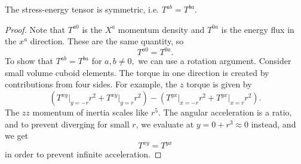 \documentclass{article}
\numberwithin{equation}{section}
\begin{document}
\begin{lemma}
    The stress-energy tensor is symmetric, i.e. $T^{ab} = T^{ba}.$
\end{lemma}
\begin{proof}
    Note that $T^{a0}$ is the $X^a$ momentum density and $T^{0a}$ is the energy flux in the $x^a$ direction. These are the same quantity, so 
    \begin{equation*}
        T^{a0} = T^{0a}.
    \end{equation*}
    To show that $T^{ab}=T^{ba}$ for $a,b \neq 0,$ we can use a rotation argument. Consider small volume cuboid elements. The torque in one direction is created by contributions from four sides. For example, the $z$ torque is given by 
    \begin{equation*}
        \left(T^{xy}\bigg|_{y=-r}r^2 + T^{xy}\bigg|_{y=r}r^2\right)  - \left(T^{yx}\bigg|_{x=-r}r^2 + T^{yx}\bigg|_{x=r}r^2\right).
    \end{equation*}
    The $zz$ momentum of inertia scales like $r^5.$ The angular acceleration is a ratio, and to prevent diverging for small $r$, we evaluate at $y=0+r^3 \approx 0$ instead, and we get 
    \begin{equation*}
        T^{xy} = T^{yx}
    \end{equation*}
    in order to prevent infinite acceleration.
\end{proof}
\end{document}
